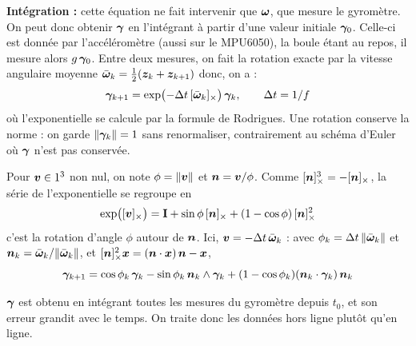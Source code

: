 \textbf{Intégration : } cette équation ne fait intervenir que $\bm{\omega}$, que mesure le gyromètre. On peut donc obtenir
$\bm{\gamma}$ en l'intégrant à partir d'une valeur initiale $\bm{\gamma}_0$. Celle-ci est donnée par l'accéléromètre (aussi sur le MPU6050), la boule étant au repos, il mesure alors $g\,\bm{\gamma}_0$. Entre deux
mesures, on fait la rotation exacte par la vitesse angulaire moyenne $\bar{\bm{\omega}}_k = \frac12(\bm{z}_k + \bm{z}_{k+1})$ donc, on a : 
\[
    \bm{\gamma}_{k+1}
    = \exp\bigl(-\Delta t\,[\bar{\bm{\omega}}_k]_{\times}\bigr)\,\bm{\gamma}_k,
    \qquad \Delta t = 1/f
\]
où l'exponentielle se calcule par la formule de Rodrigues. Une rotation
conserve la norme : on garde $\|\bm{\gamma}_k\| = 1$ sans
renormaliser, contrairement au schéma d'Euler où $\bm{\gamma}$ n'est pas conservée.

\begin{proposition}
Pour $\bm{v} \in 1^3$ non nul, on
note $\phi = \|\bm{v}\|$ et $\bm{n} = \bm{v}/\phi$. Comme
$[\bm{n}]_{\times}^3 = -[\bm{n}]_{\times}$, la série de l'exponentielle se
regroupe en
\[
    \exp\bigl([\bm{v}]_{\times}\bigr)
    = \mathbf{I} + \sin\phi\,[\bm{n}]_{\times} + (1 - \cos\phi)\,[\bm{n}]_{\times}^2
\]
c'est la rotation d'angle $\phi$ autour de $\bm{n}$. Ici,
$\bm{v} = -\Delta t\,\bar{\bm{\omega}}_k$ : avec
$\phi_k = \Delta t\,\|\bar{\bm{\omega}}_k\|$ et
$\bm{n}_k = \bar{\bm{\omega}}_k/\|\bar{\bm{\omega}}_k\|$, et
$[\bm{n}]_{\times}^2\bm{x} = (\bm{n}\cdot\bm{x})\,\bm{n} - \bm{x}$,
\[
    \bm{\gamma}_{k+1} = \cos\phi_k\,\bm{\gamma}_k
    - \sin\phi_k\,\bm{n}_k\wedge\bm{\gamma}_k
    + (1 - \cos\phi_k)(\bm{n}_k\cdot\bm{\gamma}_k)\,\bm{n}_k
\]
\end{proposition} 

\begin{remarque}
    $\bm{\gamma}$ est obtenu en intégrant toutes les mesures du
    gyromètre depuis $t_0$, et son erreur grandit avec le temps. On
    traite donc les données hors ligne plutôt qu'en ligne.
\end{remarque}
